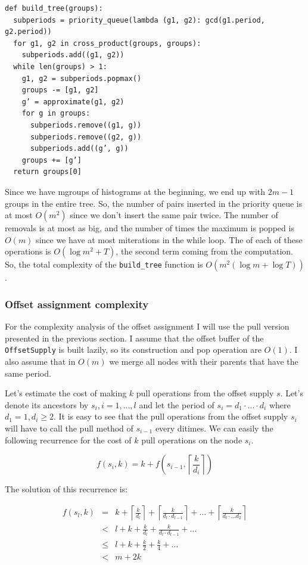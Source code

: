 \begin{verbatim}
def build_tree(groups):
  subperiods = priority_queue(lambda (g1, g2): gcd(g1.period, g2.period))
  for g1, g2 in cross_product(groups, groups):
    subperiods.add((g1, g2))
  while len(groups) > 1:
    g1, g2 = subperiods.popmax()
    groups -= [g1, g2]
    g’ = approximate(g1, g2)
    for g in groups:
      subperiods.remove((g1, g))
      subperiods.remove((g2, g))
      subperiods.add((g’, g))
    groups += [g’]
  return groups[0]
\end{verbatim}

Since we have mgroups of histograms at the beginning, we end up with $2m-1$ groups in the entire tree. So, the number of pairs inserted in the priority queue is at most $O(m^2)$ since we don’t insert the same pair twice. The number of removals is at most as big, and the number of times the maximum is popped is $O(m)$ since we have at most miterations in the while loop. The of each of these operations is $O(\log m^2+T)$, the second term coming from the  computation. So, the total complexity of the \verb+build_tree+ function is $O(m^2(\log m + \log T))$. 

\subsubsection*{Offset assignment complexity}
For the complexity analysis of the offset assignment I will use the pull version presented in the previous section. I assume that the offset buffer of the \verb+OffsetSupply+ is built lazily, so its construction and pop operation are $O(1)$. I also assume that in $O(m)$ we merge all nodes with their parents that have the same period.

Let’s estimate the cost of making $k$ pull operations from the offset supply $s$. Let’s denote its ancestors by $s_i,i=1,\ldots,l$ and let the period of $s_i=d_1\cdot\ldots\cdot d_i$ where $d_1=1, d_i \geq 2$. It is easy to see that the pull operations from the offset supply $s_i$ will have to call the pull method of $s_{i-1}$ every ditimes. We can easily the following recurrence for the cost of $k$ pull operations on the node $s_i$.

$$ f(s_i, k) = k + f\left(s_{i-1}, \left\lceil \frac k {d_i} \right\rceil \right)$$

The solution of this recurrence is:

\begin{eqnarray*}
f(s_l,k) &=& k+ \left\lceil \frac k {d_l} \right\rceil + \left\lceil \frac k {d_l\cdot d_{l-1}} \right\rceil + \ldots + \left\lceil \frac k {d_l\cdot \ldots d_2}\right\rceil \\
         &<&l+k+\frac k {d_l}+ \frac k {d_l\cdot d_{l-1}} + \ldots \\
         &\leq & l+k+\frac k 2+\frac k 4 + \ldots \\
         &<& m+2k
\end{eqnarray*}

